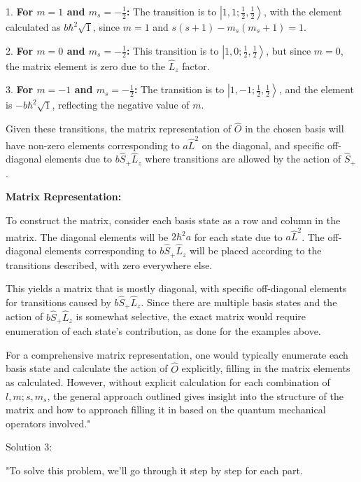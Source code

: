 1. \textbf{For \( m = 1 \) and \( m_{s} = -\frac{1}{2} \):} The transition is to \( \left|1, 1; \frac{1}{2}, \frac{1}{2} \right> \), with the element calculated as \( b\hbar^2 \sqrt{1} \), since \( m = 1 \) and \( s(s+1) - m_{s}(m_{s}+1) = 1 \).

2. \textbf{For \( m = 0 \) and \( m_{s} = -\frac{1}{2} \):} This transition is to \( \left|1, 0; \frac{1}{2}, \frac{1}{2} \right> \), but since \( m = 0 \), the matrix element is zero due to the \( \hat{L}_{z} \) factor.

3. \textbf{For \( m = -1 \) and \( m_{s} = -\frac{1}{2} \):} The transition is to \( \left|1, -1; \frac{1}{2}, \frac{1}{2} \right> \), and the element is \( -b\hbar^2 \sqrt{1} \), reflecting the negative value of \( m \).

Given these transitions, the matrix representation of \( \hat{O} \) in the chosen basis will have non-zero elements corresponding to \( a\hat{L}^2 \) on the diagonal, and specific off-diagonal elements due to \( b\hat{S}_{+}\hat{L}_{z} \) where transitions are allowed by the action of \( \hat{S}_{+} \).

\textbf{Matrix Representation:}

To construct the matrix, consider each basis state as a row and column in the matrix. The diagonal elements will be \( 2\hbar^2a \) for each state due to \( a\hat{L}^2 \). The off-diagonal elements corresponding to \( b\hat{S}_{+}\hat{L}_{z} \) will be placed according to the transitions described, with zero everywhere else.

This yields a matrix that is mostly diagonal, with specific off-diagonal elements for transitions caused by \( b\hat{S}_{+}\hat{L}_{z} \). Since there are multiple basis states and the action of \( b\hat{S}_{+}\hat{L}_{z} \) is somewhat selective, the exact matrix would require enumeration of each state's contribution, as done for the examples above.

For a comprehensive matrix representation, one would typically enumerate each basis state and calculate the action of \( \hat{O} \) explicitly, filling in the matrix elements as calculated. However, without explicit calculation for each combination of \( l, m; s, m_{s} \), the general approach outlined gives insight into the structure of the matrix and how to approach filling it in based on the quantum mechanical operators involved."

Solution 3:

"To solve this problem, we'll go through it step by step for each part.

